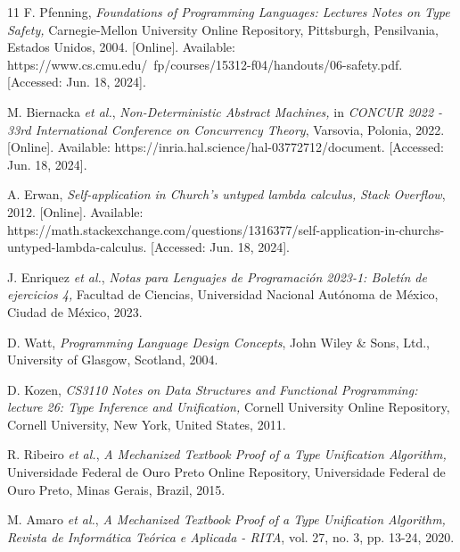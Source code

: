 \begin{thebibliography}{11}
    \label{sec:118}
    \hypertarget{118}{}
    F. Pfenning, \textit{Foundations of Programming Languages: Lectures Notes on Type Safety, } Carnegie-Mellon University Online Repository, Pittsburgh, Pensilvania, Estados Unidos, 2004. [Online]. Available: https://www.cs.cmu.edu/~fp/courses/15312-f04/handouts/06-safety.pdf. [Accessed: Jun. 18, 2024].

    \label{sec:119}
    \hypertarget{119}{}
    M. Biernacka \textit{et al.}, \textit{Non-Deterministic Abstract Machines, } in \textit{CONCUR 2022 - 33rd International Conference on Concurrency Theory}, Varsovia, Polonia, 2022. [Online]. Available: https://inria.hal.science/hal-03772712/document. [Accessed: Jun. 18, 2024].

    \label{sec:120}
    \hypertarget{120}{}
    A. Erwan, \textit{Self-application in Church's untyped lambda calculus, } \textit{Stack Overflow}, 2012. [Online]. Available: https://math.stackexchange.com/questions/1316377/self-application-in-churchs-untyped-lambda-calculus. [Accessed: Jun. 18, 2024].

    \label{sec:121}
    \hypertarget{121}{}
    J. Enriquez \textit{et al.}, \textit{Notas para Lenguajes de Programación 2023-1: Boletín de ejercicios 4, } Facultad de Ciencias, Universidad Nacional Autónoma de México, Ciudad de México, 2023.

    \label{sec:122}
    \hypertarget{122}{}
    D. Watt, \textit{Programming Language Design Concepts}, John Wiley \& Sons, Ltd., University of Glasgow, Scotland, 2004.

    \label{sec:123}
    \hypertarget{123}{}
    D. Kozen, \textit{CS3110 Notes on Data Structures and Functional Programming: lecture 26: Type Inference and Unification, } Cornell University Online Repository, Cornell University, New York, United States, 2011.

    \label{sec:124}
    \hypertarget{124}{}
    R. Ribeiro \textit{et al.}, \textit{A Mechanized Textbook Proof of a Type Unification Algorithm, } Universidade Federal de Ouro Preto Online Repository, Universidade Federal de Ouro Preto, Minas Gerais, Brazil, 2015.

    \label{sec:125}
    \hypertarget{125}{}
    M. Amaro \textit{et al.}, \textit{A Mechanized Textbook Proof of a Type Unification Algorithm, } \textit{Revista de Informática Teórica e Aplicada - RITA}, vol. 27, no. 3, pp. 13-24, 2020.


\end{thebibliography}
